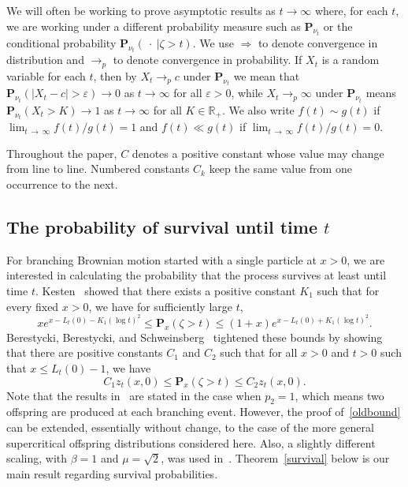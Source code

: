 \documentclass[10pt]{amsart}
\theoremstyle{definition}\newtheorem{defi}[theo]{Definition}\newtheorem{rema}[theo]{Remark}\newtheorem{exam}[theo]{Example}\newtheorem{exem}[theo]{Example}\newtheorem{nota}[theo]{Notation}
\newcommand*\eps{\varepsilon}
\renewcommand*\P{\mathbf{P}}
\newcommand*\R{\mathbb{R}}
\newcommand{\1} {\mathds{1}}
\begin{document}
We will often be working to prove asymptotic results as $t \rightarrow \infty$ where, for each $t$, we are working under a different probability measure such as $\P_{\nu_t}$ or the conditional probability $\P_{\nu_t}(\:\cdot \:|\zeta > t)$. We use $\Rightarrow$ to denote convergence in distribution and $\rightarrow_p$ to denote convergence in probability. If $X_t$ is a random variable for each $t$, then by $X_t \rightarrow_p c$ under $\P_{\nu_t}$ we mean that $\P_{\nu_t}(|X_t - c| > \eps) \rightarrow 0$ as $t \rightarrow \infty$ for all $\eps > 0$, while $X_t \rightarrow_p \infty$ under $\P_{\nu_t}$ means $\P_{\nu_t}(X_t > K) \rightarrow 1$ as $t \rightarrow \infty$ for all $K \in \R_+$. We also write $f(t) \sim g(t)$ if $\lim_{t\,\rightarrow\,\infty} f(t)/g(t) = 1$ and $f(t) \ll g(t)$ if $\lim_{t\,\rightarrow\,\infty} f(t)/g(t) = 0$.

Throughout the paper, $C$ denotes a positive constant whose value may change from line to line. Numbered constants $C_k$ keep the same value from one occurrence to the next.

\subsection{The probability of survival until time \texorpdfstring{$t$}{t}}

For branching Brownian motion started with a single particle at $x > 0$, we are interested in calculating the probability that the process survives at least until time $t$. Kesten~\cite{kesten} showed that there exists a positive constant $K_1$ such that for every fixed $x > 0$, we have for sufficiently large $t$,
\[
x e^{x - L_t(0) - K_1(\log t)^2} \leq \P_x(\zeta > t) \leq (1 + x)e^{x - L_t(0) + K_1(\log t)^2}.
\]
Berestycki, Berestycki, and Schweinsberg~\cite{bbs} tightened these bounds by showing that there are positive constants $C_1$ and $C_2$ such that for all $x > 0$ and $t > 0$ such that $x \leq L_t(0) - 1$, we have
\begin{equation}\label{oldbound}
C_1 z_t(x,0) \leq \P_x(\zeta > t) \leq C_2 z_t(x,0).
\end{equation}
Note that the results in~\cite{bbs} are stated in the case when $p_2 = 1$, which means two offspring are produced at each branching event. However, the proof of~\eqref{oldbound} can be extended, essentially without change, to the case of the more general supercritical offspring distributions considered here. Also, a slightly different scaling, with $\beta = 1$ and $\mu = \sqrt{2}$, was used in~\cite{bbs}. Theorem~\ref{survival} below is our main result regarding survival probabilities.
\end{document}
